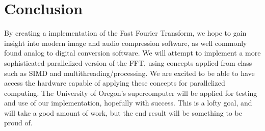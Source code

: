 \documentclass[12pt]{extarticle}
\begin{document}
\section*{Conclusion}
	By creating a implementation of the Fast Fourier Transform, we hope to gain insight into modern image and audio compression software, as well commonly found analog to digital conversion software.
    We will attempt to implement a more sophisticated parallelized version of the FFT, using concepts applied from class such as SIMD and multithreading/processing.
    We are excited to be able to have access the hardware capable of applying these concepts for parallelized computing.
	The University of Oregon's supercomputer will be applied for testing and use of our implementation, hopefully with success. 
	This is a lofty goal, and will take a good amount of work, but the end result will be something to be proud of.


\end{document}
